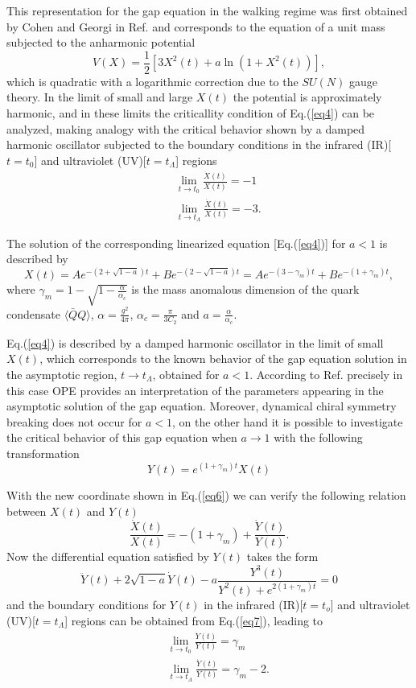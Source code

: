 \documentclass[preprint,amsmath,amssymb,superscriptaddress,showpacs,aps12pt]{revtex4}
\def\br{\begin{eqnarray}}
\def\er{\end{eqnarray}}
\def\be{\begin{equation}}
\def\ee{\end{equation}}
\begin{document}
\par  This representation for the gap equation in the walking regime was first obtained by Cohen and Georgi in Ref.\cite{georgi} and corresponds to the  equation of a unit  mass subjected to the anharmonic potential   
$$V(X) = \frac{1}{2}\left[3X^2(t) + a\ln\left( 1 + X^2(t) \right)\right],$$
which is  quadratic  with  a  logarithmic correction  due  to the $SU(N)$ gauge theory. In the limit of small and large  $X(t)$  the  potential  is  approximately  harmonic, and in these limits the criticallity condition of Eq.(\ref{eq4}) can be analyzed, making analogy with the critical behavior shown by a damped harmonic oscillator subjected to the boundary conditions in the infrared (IR)[$t=t_0$] and ultraviolet (UV)[$t=t_{\Lambda}$]  
regions\cite{Richard,georgi} 
\br 
&& \lim_{t\rightarrow t_0} \frac{\dot{X}(t)}{X(t)} = -1 \nonumber \\
&& \lim_{t\rightarrow t_{\Lambda}} \frac{\dot{X}(t)}{X(t)} = -3. 
\label{eq5} 
\er 

\par The solution of the corresponding linearized equation [Eq.(\ref{eq4})] for $ a < 1$ is described by
\be 
 X(t)  = Ae^{-(2 + \sqrt{1-a})t} + Be^{-(2 - \sqrt{1-a})t} = Ae^{-(3-\gamma_m)t} + Be^{-(1+\gamma_m)t} ,     
\ee 
\noindent  where $\gamma_m = 1 - \sqrt{1-\frac{\alpha}{\alpha_c}}$ is the  mass anomalous dimension of the quark condensate $\langle \bar{Q} Q\rangle$, $\alpha = \frac{g^2}{4\pi}$, $\alpha_c = \frac{\pi}{3C_2}$  and $a = \frac{\alpha}{\alpha_c}$. 

\par Eq.(\ref{eq4}) is described by a damped harmonic oscillator  in the limit of small
$X(t)$, which corresponds to the known behavior of the gap equation solution in the asymptotic region, $t \to t_{\Lambda}$, obtained 
for $a <1$. According to Ref.\cite{georgi} precisely in this case OPE  provides an interpretation  of  the  parameters  appearing  in  the asymptotic  solution of the  gap  equation. Moreover, dynamical chiral symmetry breaking 
does not occur for $a <1$, on the other hand it is possible to investigate the critical behavior of this gap equation when $a \to 1$ with the following  transformation \cite{georgi}
\be 
Y(t) = e^{(1+\gamma_m)t}X(t)
\label{eq6} 
\ee
 
\par With the new coordinate shown in Eq.(\ref{eq6}) we can verify the following relation between  $X(t)$ and $Y(t)$
\be 
\frac{\dot{X}(t)}{X(t)} = -(1+\gamma_m) + \frac{\dot{Y}(t)}{Y(t)}. 
\label{eq7} 
\ee 
Now the differential equation satisfied by $Y(t)$  takes the form\cite{georgi}
\be
\ddot{Y}(t) + 2\sqrt{1-a}\dot{Y}(t) -a\frac{Y^3(t)}{Y^2(t) + e^{2(1+\gamma_m)t}}=0
\label{eq8} 
\ee 
\noindent  and  the boundary conditions for  $Y(t)$ in  the infrared (IR)[$t=t_o$] and ultraviolet (UV)[$t=t_{\Lambda}$]  regions can be obtained from Eq.(\ref{eq7}), leading to
\br 
&& \lim_{t\rightarrow t_0} \frac{\dot{Y}(t)}{Y(t)} = \gamma_m \nonumber \\
&& \lim_{t\rightarrow t_{\Lambda}} \frac{\dot{Y}(t)}{Y(t)} = \gamma_m -2. 
\label{eq9} 
\er 
\end{document}

